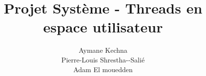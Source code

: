 \documentclass{ceri/sty/rapport}
\title{Projet Système - Threads en espace utilisateur}
\author{
  Aymane Kechna \\
  Pierre-Louis Shrestha{-}{-}Salié\\
  Adam El mouedden
}
\begin{document}
 

\maketitle

\sloppy      

























\newpage


\printbibliography
\end{document}
